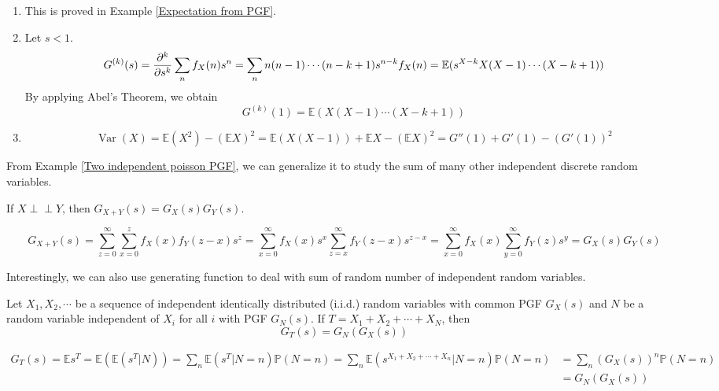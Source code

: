 \documentclass{huhtakm-template-book}
\newcommand{\independent}{\perp\!\!\!\perp}
\newcommand{\prob}{\mathbb{P}}
\newcommand{\expect}{\mathbb{E}}
\DeclareMathOperator{\Var}{Var}
\begin{document}
\begin{proofing}
	\begin{enumerate}
		\item This is proved in Example \ref{Expectation from PGF}.
		\item Let $s<1$.
		\begin{equation*}
			G^{(k)}(s)=\pdv*[order={k}]{\sum_{n}f_{X}(n)s^{n}}{s}=\sum_{n}n(n-1)\cdots(n-k+1)s^{n-k}f_{X}(n)=\expect(s^{X-k}X(X-1)\cdots(X-k+1))
		\end{equation*}
		By applying Abel's Theorem, we obtain
		\begin{equation*}
			G^{(k)}(1)=\expect(X(X-1)\cdots(X-k+1))
		\end{equation*}
		\item 
		\begin{equation*}
			\Var(X)=\expect(X^{2})-(\expect X)^{2}=\expect(X(X-1))+\expect X-(\expect X)^{2}=G''(1)+G'(1)-(G'(1))^{2}
		\end{equation*}
	\end{enumerate}
\end{proofing}
From Example \ref{Two independent poisson PGF}, we can generalize it to study the sum of many other independent discrete random variables.
\begin{thm}
	\label{Chapter 5 Theorem PGF Sum of random independent variables}
	If $X\independent Y$, then $G_{X+Y}(s)=G_{X}(s)G_{Y}(s)$.
\end{thm}
\begin{proofing}
	\begin{equation*}
		G_{X+Y}(s)=\sum_{z=0}^{\infty}\sum_{x=0}^{z}f_{X}(x)f_{Y}(z-x)s^{z}=\sum_{x=0}^{\infty}f_{X}(x)s^{x}\sum_{z=x}^{\infty}f_{Y}(z-x)s^{z-x}=\sum_{x=0}^{\infty}f_{X}(x)\sum_{y=0}^{\infty}f_{Y}(z)s^{y}=G_{X}(s)G_{Y}(s)
	\end{equation*}
\end{proofing}
Interestingly, we can also use generating function to deal with sum of random number of independent random variables.
\begin{thm}
	Let $X_{1},X_{2},\cdots$ be a sequence of independent identically distributed (i.i.d.) random variables with common PGF $G_{X}(s)$ and $N$ be a random variable independent of $X_{i}$ for all $i$ with PGF $G_{N}(s)$. If $T=X_{1}+X_{2}+\cdots+X_{N}$, then
	\begin{equation*}
		G_{T}(s)=G_{N}(G_{X}(s))
	\end{equation*}
\end{thm}
\begin{proofing}
	\begin{align*}
		G_{T}(s)=\expect s^{T}=\expect(\expect(s^{T}|N))=\sum_{n}\expect(s^{T}|N=n)\prob(N=n)
		=\sum_{n}\expect(s^{X_{1}+X_{2}+\cdots+X_{n}}|N=n)\prob(N=n)
		&=\sum_{n}(G_{X}(s))^{n}\prob(N=n)\\
		&=G_{N}(G_{X}(s))
	\end{align*}
\end{proofing}
\end{document}
